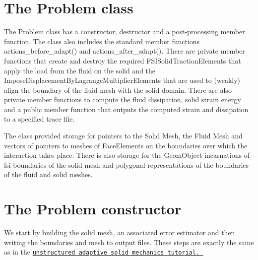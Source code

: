  

\hypertarget{index_class}{}\section{The Problem class}\label{index_class}
The {\ttfamily Problem} class has a constructor, destructor and a post-\/processing member function. The class also includes the standard member functions {\ttfamily actions\+\_\+before\+\_\+adapt()} and {\ttfamily actions\+\_\+after\+\_\+adapt()}. There are private member functions that create and destroy the required {\ttfamily F\+S\+I\+Solid\+Traction\+Elements} that apply the load from the fluid on the solid and the {\ttfamily Impose\+Displacement\+By\+Lagrange\+Multiplier\+Elements} that are used to (weakly) align the boundary of the fluid mesh with the solid domain. There are also private member functions to compute the fluid dissipation, solid strain energy and a public member function that outputs the computed strain and dissipation to a specified trace file.

The class provided storage for pointers to the Solid Mesh, the Fluid Mesh and vectors of pointers to meshes of {\ttfamily Face\+Elements} on the boundaries over which the interaction takes place. There is also storage for the {\ttfamily Geom\+Object} incarnations of fsi boundaries of the solid mesh and polygonal representations of the boundaries of the fluid and solid meshes.



 

\hypertarget{index_constructor}{}\section{The Problem constructor}\label{index_constructor}
We start by building the solid mesh, an associated error estimator and then writing the boundaries and mesh to output files. These steps are exactly the same as in the \href{../../../solid/unstructured_adaptive_solid/html/index.html}{\tt unstructured adaptive solid mechanics tutorial. }


